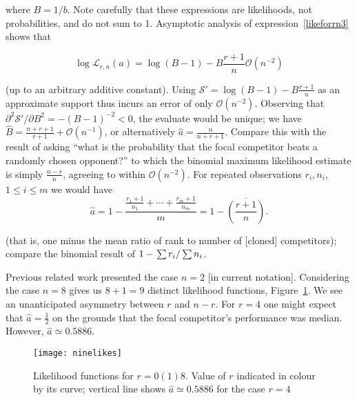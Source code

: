 \documentclass[article]{ajs}
\begin{document}
\noindent where $B=1/b$.  Note carefully that these expressions are
likelihoods, not probabilities, and do not sum to 1.  Asymptotic
analysis of expression~\ref{likeforrn3} shows that

\begin{equation}\label{asymptotic}
\log\mathcal{L}_{r,n}(a)=\log(B-1)-B\frac{r+1}{n}
\mathcal{O}\left(n^{-2}\right)
\end{equation}

(up to an arbitrary additive constant).  Using
$\mathcal{S}'=\log(B-1)-B\frac{r+1}{n}$ as an approximate support thus
incurs an error of only $\mathcal{O}(n^{-2})$.  Observing that
$\partial^2\mathcal{S'}/\partial B^2=-(B-1)^{-2}<0$, the evaluate
would be unique; we have
$\hat{B}=\frac{n+r+1}{r+1}+\mathcal{O}\left(n^{-1}\right)$, or
alternatively $\hat{a}=\frac{n}{n+r+1}$.  Compare this with the result
of asking ``what is the probability that the focal competitor
beats a randomly chosen opponent?'' to which the binomial maximum
likelihood estimate is simply $\frac{n-r}{n}$, agreeing to within
$\mathcal{O}(n^{-2})$.  For repeated observations $r_i,n_i$,
$1\leqslant i\leqslant m$ we would have
\begin{equation}
  \hat{a} = 1-
  \frac{\frac{r_1+1}{n_1}+\cdots+\frac{r_m+1}{n_m}}{m}
  = 1-\overline{\left(\frac{r+1}{n}\right)}.
\end{equation}

(that is, one minus the mean ratio of rank to number of [cloned]
competitors); compare the binomial result of $1-\left.\sum
r_i\right/\sum n_i$.

Previous related work presented the case $n=2$ [in current notation].
Considering the case $n=8$ gives us $8+1=9$ distinct likelihood
functions, Figure~\ref{ninelikes}.  We see an unanticipated asymmetry
between $r$ and $n-r$.  For $r=4$ one might expect that
$\hat{a}=\frac{1}{2}$ on the grounds that the focal competitor's
performance was median.  However, $\hat{a}\simeq 0.5886$.

\begin{figure}[t]
  \begin{centering}
\texttt{[image: ninelikes]}  %
\caption{Likelihood functions for $r=0(1)8$\label{ninelikes}.  Value
  of $r$ indicated in colour by its curve; vertical line shows
  $\hat{a}\simeq 0.5886$ for the case $r=4$}
\end{centering}
\end{figure}
\end{document}
